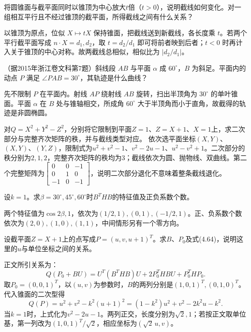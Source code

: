 将圆锥面与截平面同时以锥顶为中心放大\(t\)倍（\(t>0\)），说明截线如何变化。对一组相互平行且不经过锥顶的截平面，所得截线之间有什么关系？
\par
\solutionanswer
以锥顶为原点，位似 \(X\mapsto tX\) 保持锥面，把截线送到新截线，各长度乘 \(t\)。若两个平行截平面写成 \(n\cdot X=d_1,d_2\)，取 \(t=d_2/d_1\) 即可将前者映到后者；\(t<0\) 时再计入关于锥顶的中心对称。故两截线总相似，相似比为 \(|d_2/d_1|\)。


（据2015年浙江卷文科第7题）斜线段 \(AB\) 与平面 \(\alpha\) 成 \(60^\circ\)，\(B\) 为斜足。平面内的动点 \(P\) 满足 \(\angle PAB=30^\circ\)，其轨迹是什么曲线？
\par
\solutionanswer
先不限制 \(P\) 在平面内。射线 \(AP\) 绕射线 \(AB\) 旋转，扫出半顶角为 \(30^\circ\) 的单叶锥面。平面 \(\alpha\) 在 \(B\) 处与锥轴相交，所成角 \(60^\circ\) 大于半顶角而小于直角，故截得的轨迹是非圆椭圆。


对\(Q=X^2+Y^2-Z^2\)，分别将它限制到平面\(Z=1\)、\(Z=X+1\)、\(X=1\)上，求二次部分与完整齐次矩阵的秩，并与截线类型对应。
\solutionanswer
依次选平面坐标\((X,Y)\)、\((X,Y)\)、\((Y,Z)\)，限制式为\(u^2+v^2-1\)、\(v^2-2u-1\)、\(u^2-v^2+1\)。二次部分的秩分别为\(2,1,2\)，完整齐次矩阵的秩均为\(3\)；截线依次为圆、抛物线、双曲线。第二个完整矩阵为\(\begin{bmatrix}0&0&-1\\0&1&0\\-1&0&-1\end{bmatrix}\)，说明二次部分退化不意味着整条截线退化。


设\(k=1\)。求\(\beta=30^\circ,45^\circ,60^\circ\)时\(B^THB\)的特征值及正负系数个数。
\par
\solutionanswer
两个特征值为\(\cos2\beta,1\)，依次为\((1/2,1),(0,1),(-1/2,1)\)。正、负系数个数依次为\((2,0),(1,0),(1,1)\)，中间情形另有一个零方向。


设截平面\(Z=X+1\)上的点写成\(P=(u,v,u+1)^T\)。求\(B\)、\(P_0\)及式\textup{(4.64)}，说明这里的\(u\)与单位坐标之间的关系。
\par

\par\smallskip\noindent 正文所引关系为：
\begin{equation*}
Q(P_0+BU)=U^T(B^THB)U+2P_0^THBU+P_0^THP_0 .
\end{equation*}
\solutionanswer
取\(P_0=(0,0,1)^T\)，以\((u,v)\)为参数时，\(B\)的两列分别是\((1,0,1)^T,(0,1,0)^T\)。代入锥面的二次型得
\[
 Q(P)=u^2+v^2-k^2(u+1)^2=(1-k^2)u^2+v^2-2k^2u-k^2.
\]
当\(k=1\)时，上式化为\(v^2-2u-1\)。两列正交，长度分别为\(\sqrt2,1\)；若按正文取单位基，第一列改为\((1,0,1)^T/\sqrt2\)，相应坐标为\((\sqrt2\,u,v)\)。


